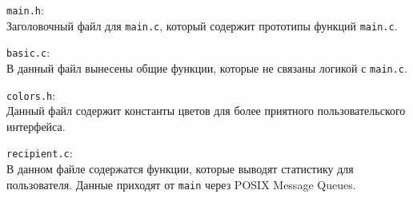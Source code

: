 \linespace

\indent \verb|main.h|:\\
Заголовочный файл для \verb|main.c|, который содержит прототипы функций \verb|main.c|.

\linespace

\indent \verb|basic.c|:\\
В данный файл вынесены общие функции, которые не связаны логикой с \verb|main.c|.

\linespace

\indent \verb|colors.h|:\\
Данный файл содержит константы цветов для более приятного пользовательского интерфейса.

\linespace

\indent \verb|recipient.c|:\\
В данном файле содержатся функции, которые выводят статистику для пользователя. Данные приходят от \verb|main| через POSIX Message Queues.
